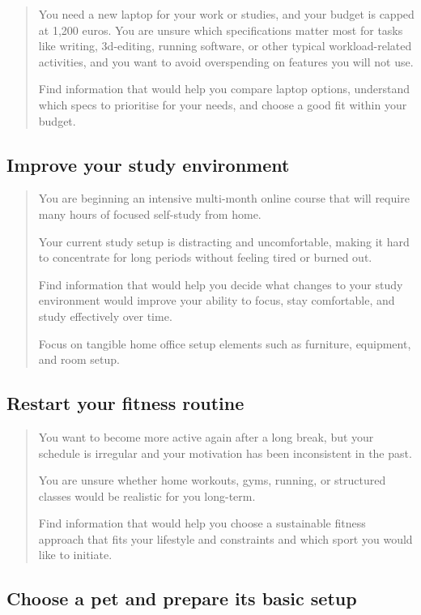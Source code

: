 \documentclass[english]{article}
\begin{document}
\begin{quote}
You need a new laptop for your work or studies, and your budget is capped at 1,200 euros. You are unsure which specifications matter most for tasks like writing, 3d-editing, running software, or other typical workload-related activities, and you want to avoid overspending on features you will not use.

Find information that would help you compare laptop options, understand which specs to prioritise for your needs, and choose a good fit within your budget.
\end{quote}

\subsection{Improve your study environment}

\begin{quote}
You are beginning an intensive multi-month online course that will require many hours of focused self-study from home.

Your current study setup is distracting and uncomfortable, making it hard to concentrate for long periods without feeling tired or burned out.

Find information that would help you decide what changes to your study environment would improve your ability to focus, stay comfortable, and study effectively over time.

Focus on tangible home office setup elements such as furniture, equipment, and room setup.
\end{quote}

\subsection{Restart your fitness routine}

\begin{quote}
You want to become more active again after a long break, but your schedule is irregular and your motivation has been inconsistent in the past.

You are unsure whether home workouts, gyms, running, or structured classes would be realistic for you long-term.

Find information that would help you choose a sustainable fitness approach that fits your lifestyle and constraints and which sport you would like to initiate.
\end{quote}

\subsection{Choose a pet and prepare its basic setup}
\end{document}
